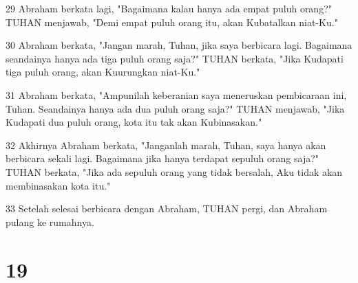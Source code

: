 \par 29 Abraham berkata lagi, "Bagaimana kalau hanya ada empat puluh orang?" TUHAN menjawab, "Demi empat puluh orang itu, akan Kubatalkan niat-Ku."
\par 30 Abraham berkata, "Jangan marah, Tuhan, jika saya berbicara lagi. Bagaimana seandainya hanya ada tiga puluh orang saja?" TUHAN berkata, "Jika Kudapati tiga puluh orang, akan Kuurungkan niat-Ku."
\par 31 Abraham berkata, "Ampunilah keberanian saya meneruskan pembicaraan ini, Tuhan. Seandainya hanya ada dua puluh orang saja?" TUHAN menjawab, "Jika Kudapati dua puluh orang, kota itu tak akan Kubinasakan."
\par 32 Akhirnya Abraham berkata, "Janganlah marah, Tuhan, saya hanya akan berbicara sekali lagi. Bagaimana jika hanya terdapat sepuluh orang saja?" TUHAN berkata, "Jika ada sepuluh orang yang tidak bersalah, Aku tidak akan membinasakan kota itu."
\par 33 Setelah selesai berbicara dengan Abraham, TUHAN pergi, dan Abraham pulang ke rumahnya.

\chapter{19}

